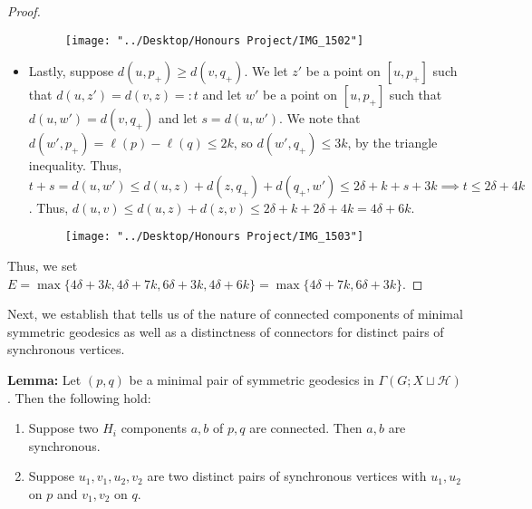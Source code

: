 \documentclass[12pt]{article}
\newcommand{\vs}{\vskip10pt}
\begin{document}
\begin{proof}
\begin{itemize}
\begin{figure} [h]
	\centering
	\texttt{[image: "../Desktop/Honours Project/IMG\_1502"]}
	\caption{}
	\label{fig:img1502}
\end{figure}

			\item Lastly, suppose $d(u, p_{+}) \geq d(v, q_{+})$. We let $z'$ be a point on $[u, p_{+}]$ such that $d(u, z') = d(v,z) =:t$ and let $w'$ be a point on $[u, p_{+}]$ such that $d(u, w') = d(v, q_{+})$ and let $s = d(u, w')$. We note that $d(w', p_{+}) = \ell(p) - \ell(q) \leq 2k$, so $d(w', q_{+}) \leq 3k$, by the triangle inequality. Thus, $t + s = d(u, w') \leq d(u, z) + d(z, q_{+}) + d(q_{+}, w') \leq 2\delta + k + s + 3k \implies t \leq 2 \delta + 4k$. Thus, $d(u,v) \leq d(u,z) + d(z, v) \leq 2 \delta + k + 2 \delta + 4k = 4 \delta + 6k$.  
			
\begin{figure} [h]
	\centering
	\texttt{[image: "../Desktop/Honours Project/IMG\_1503"]}
	\caption{}
	\label{fig:img1503}
\end{figure}
		\end{itemize}
	
		Thus, we set $E = \max \{4 \delta + 3k, 4 \delta + 7k, 6 \delta + 3k, 4 \delta + 6k\} = \max \{4 \delta + 7k, 6 \delta + 3k\}$. 
		
	\end{proof}

	\vs 
	
	Next, we establish that tells us of the nature of connected components of minimal symmetric geodesics as well as a distinctness of connectors for distinct pairs of synchronous vertices. 
	
	\vs 
	
	\textbf{Lemma: } Let $(p,q)$ be a minimal pair of symmetric geodesics in $\Gamma(G; X \sqcup \mathcal{H})$. Then the following hold: 
	
	\begin{enumerate}[label = (\roman*)]
		\item Suppose two $H_i$ components $a,b$ of $p,q$ are connected. Then $a,b$ are synchronous. 
		\item Suppose $u_1, v_1, u_2, v_2$ are two distinct pairs of synchronous vertices with $u_1, u_2$ on $p$ and $v_1, v_2$ on $q$. 
	\end{enumerate}
\end{document}
